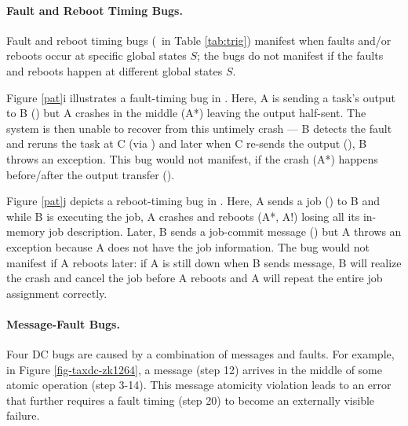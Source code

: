 


\paragraph{Fault and Reboot Timing Bugs.}

Fault and reboot timing bugs (\pctTrigFR\ in Table \ref{tab:trig})
manifest when faults and/or
reboots occur at specific global states $S$; the bugs do not
manifest if the faults and reboots happen at different global states
$S$. 

Figure \ref{pat}i illustrates a fault-timing bug in .  Here,
A is sending a task's output to B (\mab) but A
crashes in the middle (A*) leaving the output half-sent. 
The system is then unable to recover from this untimely crash --- B
detects the fault and reruns the task at C (via \mbc) and
later when C re-sends the output (\mcb), B throws an exception.  This
bug would not manifest, if the crash (A*) happens before/after
the output transfer (\mab).

Figure \ref{pat}j depicts a reboot-timing bug in .  Here,
A sends a job (\mab) to B and while B is executing the
job, A crashes and reboots (A*, A!)  losing all its in-memory job
description.  Later, B sends a job-commit message (\mba) but A throws
an exception because A does not have the job information.  The bug
would not manifest if A reboots later: if A is still down when B sends
\mba{} message, B will realize the crash and cancel the job before
A reboots and A will repeat the entire job assignment correctly.








\paragraph{Message-Fault Bugs.}
Four DC bugs are caused by a combination of messages and faults. 
For example, in Figure
\ref{fig-taxdc-zk1264}, a message (step 12) arrives in the middle of some
atomic operation (step 3-14). This message atomicity violation leads
to an error that further requires a fault timing (step 20) to become an
externally visible failure.





